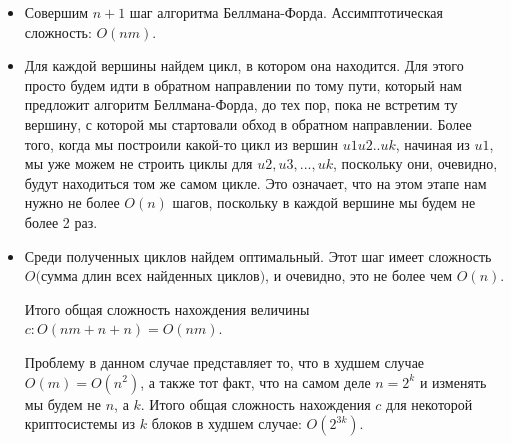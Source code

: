 \documentclass[a4paper,12pt]{article}
\begin{document}
\begin{itemize}
\item  Совершим $n+1$ шаг алгоритма Беллмана-Форда. Ассимптотическая сложность: $O(nm)$.
\item Для каждой вершины найдем цикл, в котором она находится. Для этого просто будем идти в обратном направлении по тому пути, который нам предложит алгоритм Беллмана-Форда, до тех пор, пока не встретим ту вершину, с которой мы стартовали обход в обратном направлении. Более того, когда мы построили какой-то цикл из вершин $u1 u2 .. uk$, начиная из $u1$, мы уже можем не строить циклы для $u2, u3, ..., uk$, поскольку они, очевидно, будут находиться том же самом цикле. Это означает, что на этом этапе нам нужно не более $O(n)$ шагов, поскольку в каждой вершине мы будем не более 2 раз.
\item Среди полученных циклов найдем оптимальный. Этот шаг имеет сложность $O($сумма длин всех найденных циклов$)$, и очевидно, это не более чем $O(n)$.

Итого общая сложность нахождения величины $c: O(nm +n +n) = O(nm)$.

Проблему в данном случае представляет то, что в худшем случае $O(m) = O(n^2)$, а также тот факт, что на самом деле $n = 2^k$ и изменять мы будем не $n$, а $k$. Итого общая сложность нахождения $c$ для некоторой криптосистемы из $k$ блоков в худшем случае: $O(2^{3k})$.
\end{itemize}
\end{document}
